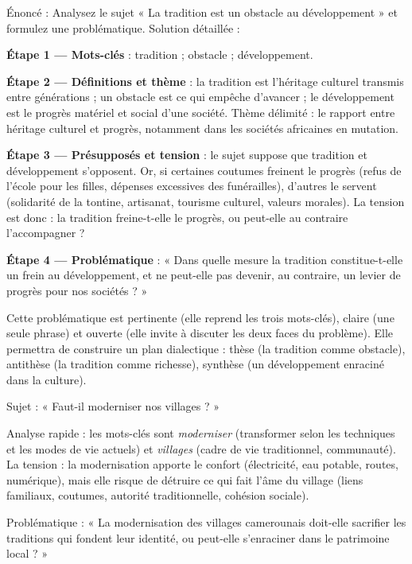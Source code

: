 \documentclass[11pt]{article}
\begin{document}
\begin{exoresolu}
Énoncé : Analysez le sujet « La tradition est un obstacle au développement » et formulez une problématique.
\tcblower
Solution détaillée :

\textbf{Étape 1 — Mots-clés} : tradition ; obstacle ; développement.

\textbf{Étape 2 — Définitions et thème} : la tradition est l'héritage culturel transmis entre générations ; un obstacle est ce qui empêche d'avancer ; le développement est le progrès matériel et social d'une société. Thème délimité : le rapport entre héritage culturel et progrès, notamment dans les sociétés africaines en mutation.

\textbf{Étape 3 — Présupposés et tension} : le sujet suppose que tradition et développement s'opposent. Or, si certaines coutumes freinent le progrès (refus de l'école pour les filles, dépenses excessives des funérailles), d'autres le servent (solidarité de la tontine, artisanat, tourisme culturel, valeurs morales). La tension est donc : la tradition freine-t-elle le progrès, ou peut-elle au contraire l'accompagner ?

\textbf{Étape 4 — Problématique} : « Dans quelle mesure la tradition constitue-t-elle un frein au développement, et ne peut-elle pas devenir, au contraire, un levier de progrès pour nos sociétés ? »

Cette problématique est pertinente (elle reprend les trois mots-clés), claire (une seule phrase) et ouverte (elle invite à discuter les deux faces du problème). Elle permettra de construire un plan dialectique : thèse (la tradition comme obstacle), antithèse (la tradition comme richesse), synthèse (un développement enraciné dans la culture).
\end{exoresolu}

\begin{exemplebox}
Sujet : « Faut-il moderniser nos villages ? »

Analyse rapide : les mots-clés sont \emph{moderniser} (transformer selon les techniques et les modes de vie actuels) et \emph{villages} (cadre de vie traditionnel, communauté). La tension : la modernisation apporte le confort (électricité, eau potable, routes, numérique), mais elle risque de détruire ce qui fait l'âme du village (liens familiaux, coutumes, autorité traditionnelle, cohésion sociale).

Problématique : « La modernisation des villages camerounais doit-elle sacrifier les traditions qui fondent leur identité, ou peut-elle s'enraciner dans le patrimoine local ? »
\end{exemplebox}
\end{document}
